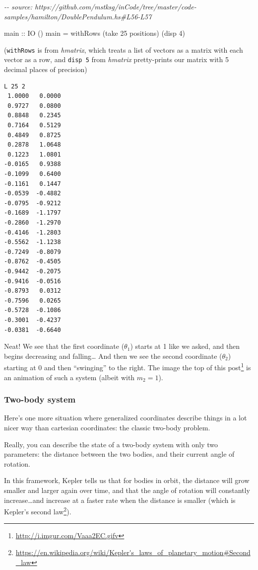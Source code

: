 \documentclass[]{article}
\newenvironment{Shaded}{}{}
\newcommand{\CommentTok}[1]{\textcolor[rgb]{0.38,0.63,0.69}{\textit{#1}}}
\newcommand{\DataTypeTok}[1]{\textcolor[rgb]{0.56,0.13,0.00}{#1}}
\newcommand{\DecValTok}[1]{\textcolor[rgb]{0.25,0.63,0.44}{#1}}
\newcommand{\FunctionTok}[1]{\textcolor[rgb]{0.02,0.16,0.49}{#1}}
\newcommand{\NormalTok}[1]{#1}
\newcommand{\OtherTok}[1]{\textcolor[rgb]{0.00,0.44,0.13}{#1}}
\renewcommand{\href}[2]{#2\footnote{\url{#1}}}
\begin{document}
\begin{Shaded}
\begin{Highlighting}[]
\CommentTok{{-}{-} source: https://github.com/mstksg/inCode/tree/master/code{-}samples/hamilton/DoublePendulum.hs\#L56{-}L57}

\OtherTok{main ::} \DataTypeTok{IO}\NormalTok{ ()}
\NormalTok{main }\OtherTok{=}\NormalTok{ withRows (}\FunctionTok{take} \DecValTok{25}\NormalTok{ positions) (disp }\DecValTok{4}\NormalTok{)}
\end{Highlighting}
\end{Shaded}

(\texttt{withRows} is from \emph{hmatrix}, which treats a list of vectors as a
matrix with each vector as a row, and \texttt{disp\ 5} from \emph{hmatrix}
pretty-prints our matrix with 5 decimal places of precision)

\begin{verbatim}
L 25 2
 1.0000   0.0000
 0.9727   0.0800
 0.8848   0.2345
 0.7164   0.5129
 0.4849   0.8725
 0.2878   1.0648
 0.1223   1.0801
-0.0165   0.9388
-0.1099   0.6400
-0.1161   0.1447
-0.0539  -0.4882
-0.0795  -0.9212
-0.1689  -1.1797
-0.2860  -1.2970
-0.4146  -1.2803
-0.5562  -1.1238
-0.7249  -0.8079
-0.8762  -0.4505
-0.9442  -0.2075
-0.9416  -0.0516
-0.8793   0.0312
-0.7596   0.0265
-0.5728  -0.1086
-0.3001  -0.4237
-0.0381  -0.6640
\end{verbatim}

Neat! We see that the first coordinate (\(\theta_1\)) starts at 1 like we asked,
and then begins decreasing and falling\ldots{} And then we see the second
coordinate (\(\theta_2\)) starting at 0 and then ``swinging'' to the right. The
\href{http://i.imgur.com/Vaaa2EC.gifv}{image the top of this post} is an
animation of such a system (albeit with \(m_2 = 1\)).

\subsubsection{Two-body system}\label{two-body-system}

Here's one more situation where generalized coordinates describe things in a lot
nicer way than cartesian coordinates: the classic two-body problem.

Really, you can describe the state of a two-body system with only two
parameters: the distance between the two bodies, and their current angle of
rotation.

In this framework, Kepler tells us that for bodies in orbit, the distance will
grow smaller and larger again over time, and that the angle of rotation will
constantly increase\ldots and increase at a faster rate when the distance is
smaller (which is
\href{https://en.wikipedia.org/wiki/Kepler's_laws_of_planetary_motion\#Second_law}{Kepler's
second law}).
\end{document}
